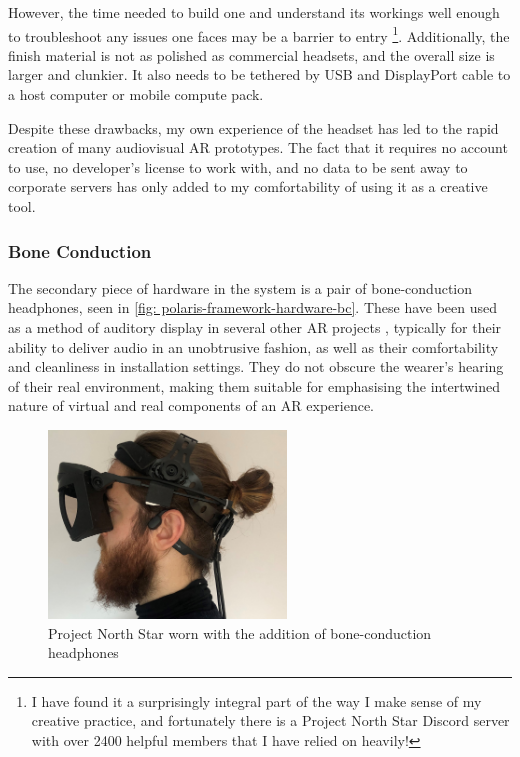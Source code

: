 However, the time needed to build one and understand its workings well enough to trouble\-shoot any issues one faces may be a barrier to entry \footnote{I have found it a surprisingly integral part of the way I make sense of my creative practice, and fortunately there is a Project North Star Discord server with over 2400 helpful members that I have relied on heavily!}. Additionally, the finish material is not as polished as commercial headsets, and the overall size is larger and clunkier. It also needs to be tethered by USB and DisplayPort cable to a host computer or mobile compute pack.

Despite these drawbacks, my own experience of the headset has led to the rapid creation of many audiovisual AR prototypes. The fact that it requires no account to use, no developer’s license to work with, and no data to be sent away to corporate servers has only added to my comfortability of using it as a creative tool.

\subsubsection{Bone Conduction}\label{sec: polaris-framework-hardware-bc}
The secondary piece of hardware in the system is a pair of bone-conduction headphones, seen in \autoref{fig: polaris-framework-hardware-bc}. These have been used as a method of auditory display in several other AR projects \citep{lindeman2008,barde2016,chevalier2018}, typically for their ability to deliver audio in an unobtrusive fashion, as well as their comfortability and cleanliness in installation settings. They do not obscure the wearer’s hearing of their real environment, making them suitable for emphasising the intertwined nature of virtual and real components of an AR experience.
\begin{figure}
    \centering
    \includegraphics[height=5cm]{figures/06-polaris/polaris-framework-hardware-bc.jpg}
    \caption{Project North Star worn with the addition of bone-conduction headphones}
    \label{fig: polaris-framework-hardware-bc}
\end{figure}

